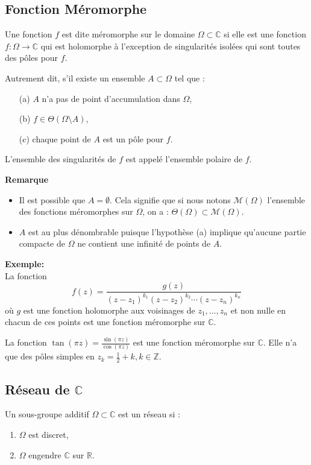 \documentclass{article}
\begin{document}
\subsection{Fonction Méromorphe}
Une fonction $f$ est dite méromorphe sur le domaine $\Omega \subset \mathbb{C}$ si elle est une fonction $f : \Omega \to \mathbb{C}$ qui est holomorphe à l'exception de singularités isolées qui sont toutes des pôles pour $f$.

Autrement dit, s'il existe un ensemble $A \subset \Omega$ tel que :
\begin{itemize}
    \item[(a)] $A$ n'a pas de point d'accumulation dans $\Omega$,
    \item[(b)] $f \in \Theta(\Omega \setminus A)$,
    \item[(c)] chaque point de $A$ est un pôle pour $f$.
\end{itemize}
L'ensemble des singularités de $f$ est appelé l'ensemble polaire de $f$.

\textbf{Remarque}
\begin{itemize}
    \item Il est possible que $A = \emptyset$. Cela signifie que si nous notons $\mathcal{M}(\Omega)$ l'ensemble des fonctions méromorphes sur $\Omega$, on a : $\Theta(\Omega) \subset \mathcal{M}(\Omega)$.
    \item $A$ est au plus dénombrable puisque l'hypothèse (a) implique qu'aucune partie compacte de $\Omega$ ne contient une infinité de points de $A$.
\end{itemize}

\textbf{Exemple:} \\
La fonction
\[
f(z) = \frac{g(z)}{(z - z_1)^{k_1}(z - z_2)^{k_2} \cdots (z - z_n)^{k_n}}
\]
où $g$ est une fonction holomorphe aux voisinages de $z_1, \ldots, z_n$ et non nulle en chacun de ces points est une fonction méromorphe sur $\mathbb{C}$.

La fonction $\tan(\pi z) = \frac{\sin(\pi z)}{\cos(\pi z)}$ est une fonction méromorphe sur $\mathbb{C}$. Elle n'a que des pôles simples en $z_k = \frac{1}{2} + k, k \in \mathbb{Z}$.

\subsection{Réseau de $ \mathbb{C}$ }
Un sous-groupe additif $\Omega \subset \mathbb{C}$ est un réseau si :
\begin{enumerate}
    \item $\Omega$ est discret,
    \item $\Omega$ engendre $\mathbb{C}$ sur $\mathbb{R}$.
\end{enumerate}
\end{document}
